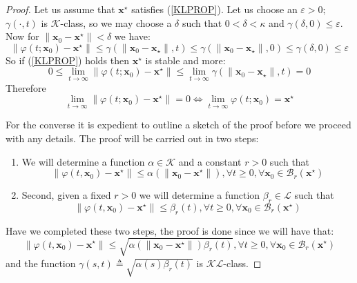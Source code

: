 \documentclass[a4paper,10pt,oneside]{book}
\begin{document}
\begin{proof}
 Let us assume that $\mathbf{x}^\star$ satisfies (\ref{KLPROP}). Let us choose an $\varepsilon>0$; $\gamma(\cdot,t)$ is $\mathcal{K}$-class, so we may choose a $\delta$ such that $0<\delta<\kappa$ and $\gamma(\delta,0)\leq \varepsilon$. Now for $\|\mathbf{x}_0-\mathbf{x}^\star\|<\delta$ we have:
\begin{equation}
 \|\varphi(t;\mathbf{x}_0)-\mathbf{x}^\star\|\leq\gamma(\|\mathbf{x}_0-\mathbf{x}_\star\|,t)\leq\gamma(\|\mathbf{x}_0-\mathbf{x}_\star\|,0)\leq\gamma(\delta,0)\leq\varepsilon
\end{equation}
So if (\ref{KLPROP}) holds then $\mathbf{x}^\star$ is stable and more:
\begin{equation}
 0\leq\lim_{t\to\infty}\|\varphi(t;\mathbf{x}_0)-\mathbf{x}^\star\|\leq \lim_{t\to\infty}\gamma(\|\mathbf{x}_0-\mathbf{x}_\star\|,t)=0
\end{equation}
Therefore
\begin{equation}
 \lim_{t\to\infty}\|\varphi(t;\mathbf{x}_0)-\mathbf{x}^\star\|=0\Leftrightarrow\lim_{t\to\infty}\varphi(t;\mathbf{x}_0)=\mathbf{x}^\star
\end{equation}

For the converse it is expedient to outline a sketch of the proof before we
proceed with any details. The proof will be carried out in two steps:
\begin{enumerate}
 \item We will determine a function $\alpha\in\mathcal K$ and a constant $r>0$ such that 
\begin{equation*}
 \|\varphi(t,\mathbf{x}_0)-\mathbf{x}^\star\| \leq \alpha(\|\mathbf{x}_0-\mathbf{x}^\star\|),
  \forall t\geq0,\forall \mathbf{x}_0\in\mathcal{B}_r(\mathbf{x}^\star)
\end{equation*}
\item Second, given a fixed $r>0$ we will determine a function $\beta_r\in\mathcal{L}$ such that
\begin{equation*}
 \|\varphi(t,\mathbf{x}_0)-\mathbf{x}^\star\| \leq \beta_r(t),
\forall t\geq 0,\forall \mathbf{x}_0\in\mathcal{B}_r(\mathbf{x}^\star)
\end{equation*}
\end{enumerate}
Have we completed these two steps, the proof is done since we will have that:
\begin{equation}
 \|\varphi(t,\mathbf{x}_0)-\mathbf{x}^\star\| \leq \sqrt{\alpha(\|\mathbf{x}_0-\mathbf{x}^\star\|)\beta_r(t)},
\forall t\geq 0, \forall  \mathbf{x}_0\in\mathcal{B}_r(\mathbf{x}^\star)
\end{equation}
and the function $\gamma(s,t)\triangleq\sqrt{\alpha(s)\beta_r(t)}$ is $\mathcal{KL}$-class.


\end{proof}
\end{document}
